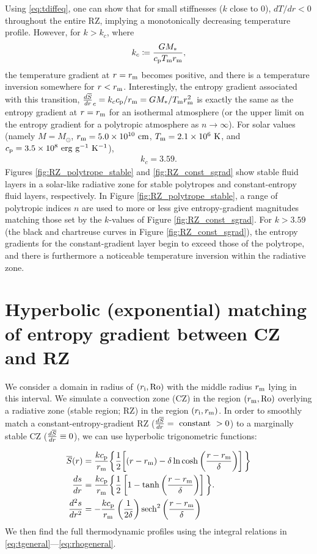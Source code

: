 \documentclass[12pt]{article} %
\newcommand{\rrm}{r_{\rm{m}}}
\newcommand{\ri}{r_{\rm{i}}}
\begin{document}
Using \eqref{eq:tdiffeq}, one can show that for small stiffnesses ($k$ close to $0$), $dT/dr < 0$ throughout the entire RZ, implying a monotonically decreasing temperature profile. However, for $k>k_c$, where
\begin{align}
k_c\coloneqq \frac{G\mstar}{\cp T_{\rm{m}}\rrm},
\end{align}
the temperature gradient at $r=\rrm$ becomes positive, and there is a temperature inversion somewhere for $r<\rrm$. Interestingly, the entropy gradient associated with this transition, $\dsdr_c=k_c\cp/\rrm=G\mstar/T_{\rm{m}}\rrm^2$ is exactly the same as the entropy gradient at $r=\rrm$ for an isothermal atmosphere (or the upper limit on the entropy gradient for a polytropic atmosphere as $n\rightarrow\infty$). For solar values (namely $M=M_\odot$, $\rrm = 5.0\times10^{10}\ \rm{cm}$, $T_{\rm{m}} = 2.1\times10^6\ \rm{K}$, and $\cp=3.5\times10^8\ \rm{erg\ g^{-1}\ K^{-1}}$),
\begin{align}
k_c = 3.59.
\label{eq:kc_solar}
\end{align}
Figures \ref{fig:RZ_polytrope_stable} and \ref{fig:RZ_const_sgrad} show stable fluid layers in a solar-like radiative zone for stable polytropes and constant-entropy fluid layers, respectively. In Figure \ref{fig:RZ_polytrope_stable}, a range of polytropic indices $n$ are used to more or less give entropy-gradient magnitudes matching those set by the $k$-values of Figure \ref{fig:RZ_const_sgrad}. For $k>3.59$ (the black and chartreuse curves in Figure \ref{fig:RZ_const_sgrad}), the entropy gradients for the constant-gradient layer begin to exceed those of the polytrope, and there is furthermore a noticeable temperature inversion within the radiative zone.

\section{Hyperbolic (exponential)  matching of entropy gradient between CZ and RZ}
We consider a domain in radius of $(\ri,\ro)$ with the middle radius $\rrm$ lying in this interval. We simulate a convection zone (CZ) in the region $(\rrm, \ro)$ overlying a radiative zone (stable region; RZ) in the region $(\ri,\rrm)$. In order to smoothly match a constant-entropy-gradient RZ ($\frac{d\overline{S}}{dr}=\ \rm{constant}\ > 0$) to a marginally stable CZ ($\frac{d\overline{S}}{dr}\equiv 0$), we can use hyperbolic trigonometric functions:

\begin{align}
\sref\ofr &= \frac{k\cp}{\rrm}\bigg{\{}\frac{1}{2}{\left[(r-\rrm) -\delta\ln\cosh{\left(\frac{r-\rrm}{\delta}\right)}\right]\bigg{\}}}\label{eq:s_tanh_transition}\\
\frac{ds}{dr} &= \frac{k\cp}{\rrm}\bigg{\{}\frac{1}{2}\left[1 - \tanh{\left(\frac{r-\rrm}{\delta}\right)}\right]\bigg{\}}.\label{eq:dsdr_tanh_transition}\\
\frac{d^2s}{dr^2} &= -\frac{k\cp}{\rrm}\left(\frac{1}{2\delta}\right){\rm{sech}}^2\left(\frac{r-\rrm}{\delta}\right)
\end{align}
We then find the full thermodynamic profiles using the integral relations in \eqref{eq:tgeneral}---\eqref{eq:rhogeneral}.
\end{document}
